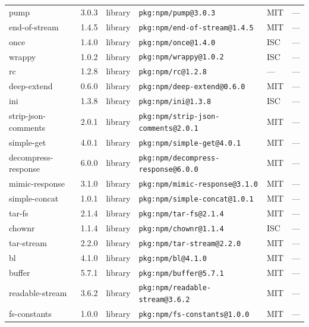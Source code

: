 \documentclass[11pt,a4paper]{article}
\begin{document}
\begin{longtable}{|p{4cm}|p{2cm}|p{1.6cm}|p{5cm}|p{1.5cm}|p{3.5cm}|}
\raggedright pump & 3.0.3 & library & \small\texttt{pkg:npm/pump@3.0.3} & MIT & \small — \\
\raggedright end-of-stream & 1.4.5 & library & \small\texttt{pkg:npm/end-of-stream@1.4.5} & MIT & \small — \\
\raggedright once & 1.4.0 & library & \small\texttt{pkg:npm/once@1.4.0} & ISC & \small — \\
\raggedright wrappy & 1.0.2 & library & \small\texttt{pkg:npm/wrappy@1.0.2} & ISC & \small — \\
\raggedright rc & 1.2.8 & library & \small\texttt{pkg:npm/rc@1.2.8} & — & \small — \\
\raggedright deep-extend & 0.6.0 & library & \small\texttt{pkg:npm/deep-extend@0.6.0} & MIT & \small — \\
\raggedright ini & 1.3.8 & library & \small\texttt{pkg:npm/ini@1.3.8} & ISC & \small — \\
\raggedright strip-json-comments & 2.0.1 & library & \small\texttt{pkg:npm/strip-json-comments@2.0.1} & MIT & \small — \\
\raggedright simple-get & 4.0.1 & library & \small\texttt{pkg:npm/simple-get@4.0.1} & MIT & \small — \\
\raggedright decompress-response & 6.0.0 & library & \small\texttt{pkg:npm/decompress-response@6.0.0} & MIT & \small — \\
\raggedright mimic-response & 3.1.0 & library & \small\texttt{pkg:npm/mimic-response@3.1.0} & MIT & \small — \\
\raggedright simple-concat & 1.0.1 & library & \small\texttt{pkg:npm/simple-concat@1.0.1} & MIT & \small — \\
\raggedright tar-fs & 2.1.4 & library & \small\texttt{pkg:npm/tar-fs@2.1.4} & MIT & \small — \\
\raggedright chownr & 1.1.4 & library & \small\texttt{pkg:npm/chownr@1.1.4} & ISC & \small — \\
\raggedright tar-stream & 2.2.0 & library & \small\texttt{pkg:npm/tar-stream@2.2.0} & MIT & \small — \\
\raggedright bl & 4.1.0 & library & \small\texttt{pkg:npm/bl@4.1.0} & MIT & \small — \\
\raggedright buffer & 5.7.1 & library & \small\texttt{pkg:npm/buffer@5.7.1} & MIT & \small — \\
\raggedright readable-stream & 3.6.2 & library & \small\texttt{pkg:npm/readable-stream@3.6.2} & MIT & \small — \\
\raggedright fs-constants & 1.0.0 & library & \small\texttt{pkg:npm/fs-constants@1.0.0} & MIT & \small — \\

\end{longtable}
\end{document}
